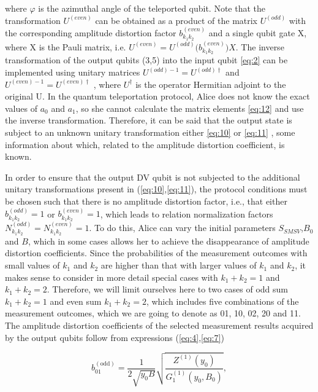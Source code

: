 \documentclass{optica-article}
\begin{document}
\!\!\!\!\!\!where $\varphi$ is the azimuthal angle of the teleported qubit. Note that the transformation $U^{(even)}$ can be obtained as a product of the matrix $U^{(odd)}$ with the corresponding amplitude distortion factor  $b_{k_1 k_2}^{(even)}$ and a single qubit gate X, where X is the Pauli matrix, i.e. $U^{(even)}=U^{(odd)} \Big(b_{k_1 k_2}^{(even)}\Big)X$.
The inverse transformation of the output qubits (3,5) into the input qubit \eqref{eq:2}  can be implemented using unitary matrices $U^{(odd)-1}=U^{(odd)\dagger}$ and $U^{(even)-1}=U^{(even)\dagger}$ , where $U^\dagger$ is the operator Hermitian adjoint to the original U. In the quantum teleportation protocol, Alice does not know the exact values of $a_0$ and $a_1$, so she cannot calculate the matrix elements \eqref{eq:12}  and use the inverse transformation. Therefore, it can be said that the output state is subject to an unknown unitary transformation either \eqref{eq:10}  or \eqref{eq:11} , some information about which, related to the amplitude distortion coefficient, is known. 
\par In order to ensure that the output DV qubit is not subjected to the additional unitary transformations present in (\ref{eq:10},\ref{eq:11}), the protocol conditions must be chosen such that there is no amplitude distortion factor, i.e., that either $b_{k_1 k_2}^{(odd)}=1$ or $b_{k_1k_2}^{(even)}=1$, which leads to relation normalization factors $N_{k_1k_2}^{(odd)}=N_{k_1 k_2}^{(even)}=1$. 
To do this, Alice can vary the initial parameters $S_{SMSV}$,$B_0$ and $B$, which in some cases allows her to achieve the disappearance of amplitude distortion coefficients. Since the probabilities of the measurement outcomes with small values of $k_1$ and $k_2$ are higher than that with larger values of $k_1$ and $k_2$, it makes sense to consider in more detail special cases with $k_1+k_2=1$ and $k_1+k_2=2$. Therefore, we will limit ourselves here to two cases of odd sum $k_1+k_2=1$ and even sum $k_1+k_2=2$, which includes five combinations of the measurement outcomes, which we are going to denote as 01, 10, 02, 20 and 11. 
The amplitude distortion coefficients of the selected measurement results acquired by the output qubits follow from expressions (\ref{eq:4},\ref{eq:7})


\begin{equation}\label{eq:13}
		b_{01}^{(\text{odd})} = \frac{1}{2\sqrt{y_0 B}} \sqrt{\frac{Z^{(1)}(y_0)}{G_1^{(1)}(y_0,B_0)}},
\end{equation}
\end{document}
